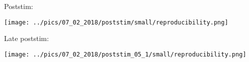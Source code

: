 \documentclass{article}
\begin{document}
Poststim:

\texttt{[image: ../pics/07\_02\_2018/poststim/small/reproducibility.png]}

Late poststim:

\texttt{[image: ../pics/07\_02\_2018/poststim\_05\_1/small/reproducibility.png]}






\end{document}
